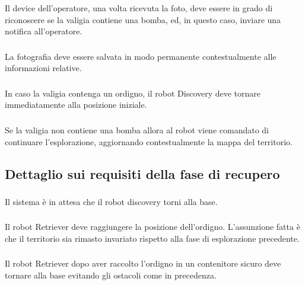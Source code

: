 Il device dell'operatore, una volta ricevuta la foto, deve essere in grado di riconoscere
se la valigia contiene una bomba, ed, in questo caso, inviare una notifica all'operatore.

\subsubsection[R-storePhoto]{}

La fotografia deve essere salvata in modo permanente contestualmente alle informazioni relative.

\subsubsection[R-backHomeSinceBomb]{}

In caso la valigia contenga un ordigno, il robot Discovery deve tornare immediatamente alla posizione iniziale.

\subsubsection[R-continueExploreAfterPhoto]{}

Se la valigia non contiene una bomba allora al robot viene comandato di continuare l'esplorazione, aggiornando contestualmente la mappa del territorio.

\subsection{Dettaglio sui requisiti della fase di recupero}

\subsubsection[R-waitForHome]{}

Il sistema è in attesa che il robot discovery torni alla base.

\subsubsection[R-reachBag]{}

Il robot Retriever deve raggiungere la posizione dell'ordigno.
L'assunzione fatta è che il territorio sia rimasto invariato rispetto alla fase di esplorazione precedente.

\subsubsection[R-bagAtHome]{}

Il robot Retriever dopo aver raccolto l'ordigno in un contenitore sicuro deve tornare alla base evitando gli ostacoli come in precedenza.
